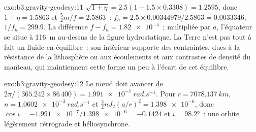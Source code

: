\begin{solution}{exo:b3:gravity-geodesy:11}
$\sqrt{1 + \eta} = 2.5(1 - 1.5\times0.3308) = 1.2595$, donc $1 + \eta = 1.5863$
et $\tfrac52m/f = 2.5863$~: $f_h = 2.5\times0.00344979/2.5863 = \num{0.0033346}$,
$1/f_h = 299.9$. La différence $f - f_h = \num{1.82e-5}$~; multipliée par $a$, l'équateur
se situe à \qty{116}{m} au-dessus de la figure hydrostatique. La Terre n'est pas tout à fait
un fluide en équilibre~: son intérieur supporte des contraintes, dues à la résistance de
la lithosphère ou aux écoulements et aux contrastes de densité du manteau, qui maintiennent
cette forme un peu à l'écart de cet équilibre.
\end{solution}

\begin{solution}{exo:b3:gravity-geodesy:12}
Le nœud doit avancer de $2\pi/(365.242\times86\,400) =
\qty{1.991e-7}{rad.s^{-1}}$. Pour $r = \qty{7078.137}{km}$, $n =
\qty{1.0602e-3}{rad.s^{-1}}$ et $\tfrac32nJ_2(a/r)^2 = \num{1.398e-6}$, donc
$\cos i = -\num{1.991e-7}/\num{1.398e-6} = -0.1424$ et $i = \ang{98.2}$~: une
orbite légèrement rétrograde et héliosynchrone.
\end{solution}


